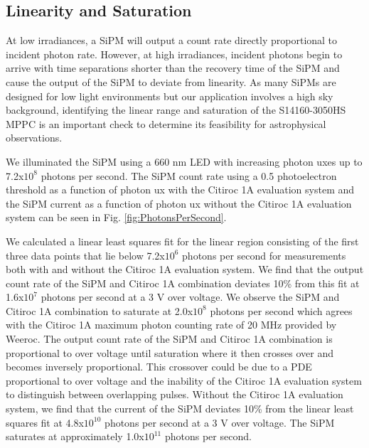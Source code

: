 \documentclass{article}
\begin{document}
\subsection{Linearity and Saturation}
At low irradiances, a SiPM will output a count rate directly proportional to incident photon rate. However, at high irradiances, incident photons begin to arrive with time separations shorter than the recovery time of the SiPM and cause the output of the SiPM to deviate from linearity. As many SiPMs are designed for low light environments but our application involves a high sky background, identifying the linear range and saturation of the S14160-3050HS MPPC is an important check to determine its feasibility for astrophysical observations.

We illuminated the SiPM using a 660 nm LED with increasing photon uxes up to 7.2x$10^8$ photons per second. The SiPM count rate using a 0.5 photoelectron threshold as a function of photon ux with the Citiroc 1A evaluation system and the SiPM current as a function of photon ux without the Citiroc 1A evaluation system can be seen in Fig. \ref{fig:PhotonsPerSecond}.

We calculated a linear least squares fit for the linear region consisting of the first three data points that lie
below 7.2x$10^6$ photons per second for measurements both with and without the Citiroc 1A evaluation system.
We find that the output count rate of the SiPM and Citiroc 1A combination deviates 10\% from this fit at 1.6x$10^7$
photons per second at a 3 V over voltage. We observe the SiPM and Citiroc 1A combination to saturate at 2.0x$10^8$ photons per second which agrees with the Citiroc 1A maximum photon counting rate of 20 MHz provided by Weeroc.\cite{Weeroc2019} The output count rate of the SiPM and Citiroc 1A combination is proportional to over voltage until saturation where it then crosses over and becomes inversely proportional. This crossover could be due to a PDE proportional to over voltage and the inability of the Citiroc 1A evaluation system to distinguish between overlapping pulses. Without the Citiroc 1A evaluation system, we find that the current of the SiPM deviates 10\% from the linear least squares fit at 4.8x$10^10$ photons per second at a 3 V over voltage. The SiPM saturates at approximately 1.0x$10^11$ photons per second.
\end{document}
